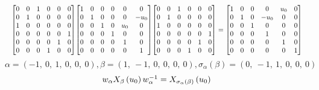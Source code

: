 \documentclass[11pt]{article}
\theoremstyle{definition}
\begin{document}
\[
\scaletoalign{\textwidth}{{\left[\begin{matrix}0 & 0 & 1 & 0 & 0 & 0\\0 & 1 & 0 & 0 & 0 & 0\\1 & 0 & 0 & 0 & 0 & 0\\0 & 0 & 0 & 0 & 0 & 1\\0 & 0 & 0 & 0 & 1 & 0\\0 & 0 & 0 & 1 & 0 & 0\end{matrix}\right]} {\left[\begin{matrix}1 & 0 & 0 & 0 & 0 & 0\\0 & 1 & 0 & 0 & 0 & - u_{0}\\0 & 0 & 1 & 0 & u_{0} & 0\\0 & 0 & 0 & 1 & 0 & 0\\0 & 0 & 0 & 0 & 1 & 0\\0 & 0 & 0 & 0 & 0 & 1\end{matrix}\right]} {\left[\begin{matrix}0 & 0 & 1 & 0 & 0 & 0\\0 & 1 & 0 & 0 & 0 & 0\\1 & 0 & 0 & 0 & 0 & 0\\0 & 0 & 0 & 0 & 0 & 1\\0 & 0 & 0 & 0 & 1 & 0\\0 & 0 & 0 & 1 & 0 & 0\end{matrix}\right]} = {\left[\begin{matrix}1 & 0 & 0 & 0 & u_{0} & 0\\0 & 1 & 0 & - u_{0} & 0 & 0\\0 & 0 & 1 & 0 & 0 & 0\\0 & 0 & 0 & 1 & 0 & 0\\0 & 0 & 0 & 0 & 1 & 0\\0 & 0 & 0 & 0 & 0 & 1\end{matrix}\right]}}
\]
\[
\alpha = \left( -1, \  0, \  1, \  0, \  0, \  0\right), \beta = \left( 1, \  -1, \  0, \  0, \  0, \  0\right), \sigma_{\alpha}(\beta) = \left( 0, \  -1, \  1, \  0, \  0, \  0\right)
\]
\[
\scaletoalign{\textwidth}{w_{\alpha} X_{\beta}\left(u_{0}\right) w_{\alpha}^{-1} = X_{\sigma_{\alpha}\left(\beta\right)}\left(u_{0}\right)}
\]
\end{document}
